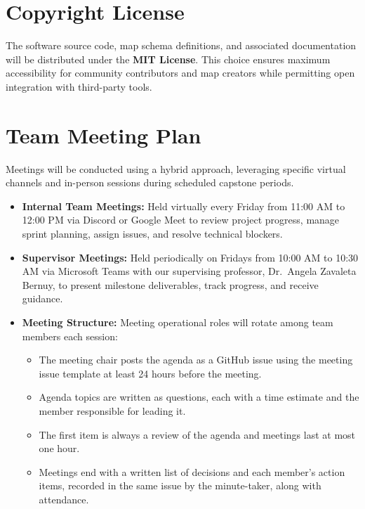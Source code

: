 \documentclass{article}
\begin{document}
\section{Copyright License}

The software source code, map schema definitions, and associated documentation will be distributed under the \textbf{MIT License}. This choice ensures maximum accessibility for community contributors and map creators while permitting open integration with third-party tools.

\section{Team Meeting Plan}

Meetings will be conducted using a hybrid approach, leveraging specific virtual channels and in-person sessions during scheduled capstone periods.

\begin{itemize}
    \item \textbf{Internal Team Meetings:} Held virtually every Friday from 11:00 AM to 12:00 PM via Discord or Google Meet to review project progress, manage sprint planning, assign issues, and resolve technical blockers.
    \item \textbf{Supervisor Meetings:} Held periodically on Fridays from 10:00 AM to 10:30 AM via Microsoft Teams with our supervising professor, Dr.~Angela Zavaleta Bernuy, to present milestone deliverables, track progress, and receive guidance.
    \item \textbf{Meeting Structure:} Meeting operational roles will rotate among team members each session:
    \begin{itemize}
        \item The meeting chair posts the agenda as a GitHub issue using the meeting issue template at least 24 hours before the meeting.
        \item Agenda topics are written as questions, each with a time estimate and the member responsible for leading it.
        \item The first item is always a review of the agenda and meetings last at most one hour.
        \item Meetings end with a written list of decisions and each member's action items, recorded in the same issue by the minute-taker, along with attendance.
    \end{itemize}
\end{itemize}
\end{document}
